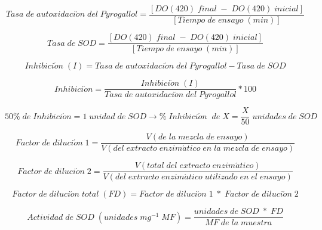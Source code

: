 \begin{equation}
Tasa \; de \; autoxidaci\acute{o}n \; del \; Pyrogallol =\frac {[DO(420) \; final \; - \; DO(420) \; inicial]} {[Tiempo \; de \; ensayo \; (min)]}
\label{tasapyr}
\end{equation}

\begin{equation}
Tasa \; de \; SOD =\frac {[DO(420) \; final \; - \; DO(420) \; inicial]} {[Tiempo \; de \; ensayo \; (min)]}
\label{tasasod}
\end{equation}

\begin{equation}
Inhibici\acute{o}n \; (I) ={Tasa \; de \; autoxidaci\acute{o}n \; del \; Pyrogallol} - {Tasa \; de \; SOD}
\label{inh}
\end{equation}

\begin{equation}
Inhibici\acute{o}n = {\frac{Inhibici\acute{o}n \; (I)} {Tasa \; de \; autoxidaci\acute{o}n \; del \; Pyrogallol} * 100}
\label{inhporc}
\end{equation}

\begin{equation}
50\% \; de \; Inhibici\acute{o}n ={1 \; unidad \; de \; SOD} \rightarrow \% \; Inhibici\acute{o}n \;  \; de \;  X  = \frac{X}{50} \; unidades \; de \; SOD
\label{50inh}
\end{equation}

\begin{equation}
Factor \; de \; diluci\acute{o}n \; 1 = \frac{V (de \; la \; mezcla \; de \; ensayo)}{V (del \; extracto \; enzim\acute{a}tico \; en \; la\; mezcla \; de \; ensayo)}
\label{fd1}
\end{equation}

\begin{equation}
Factor \; de \; diluci\acute{o}n \; 2 = \frac{V (total \; del \; extracto \; enzim\acute{a}tico)}{V (del \; extracto \; enzim\acute{a}tico \; utilizado \; en\; el \; ensayo)}
\label{fd2}
\end{equation}

\begin{equation}
Factor \; de \; diluci\acute{o}n \; total \; (FD) ={Factor \; de \; diluci\acute{o}n \; 1 \; * \; Factor \; de \; diluci\acute{o}n \; 2}
\label{FD}
\end{equation}

\begin{equation}
Actividad \; de \; SOD \; (unidades \; mg^{-1} \; MF) = \frac{unidades \; de \; SOD \; * \; FD}{MF \; de \; la \; muestra} 
\label{act}
\end{equation}

